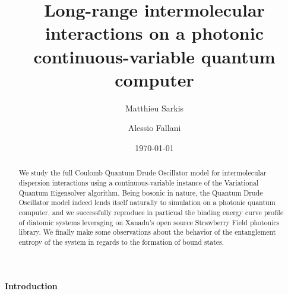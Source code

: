 \documentclass[reprint, amsmath, amssymb, aps, pra]{revtex4-2}
\begin{document}
\preprint{}

\title{Long-range intermolecular interactions on a photonic continuous-variable quantum computer}

\author{Matthieu Sarkis}

\author{Alessio Fallani}


\date{\today}

\begin{abstract}
    We study the full Coulomb Quantum Drude Oscillator model for intermolecular dispersion interactions using a continuous-variable instance of the Variational Quantum Eigensolver algorithm. Being bosonic in nature, the Quantum Drude Oscillator model indeed lends itself naturally to simulation on a photonic quantum computer, and we successfully reproduce in particual the binding energy curve profile of diatomic systems leveraging on Xanadu's open source Strawberry Field photonics library. We finally make some observations about the behavior of the entanglement entropy of the system in regards to the formation of bound states.
\end{abstract}


\maketitle


\paragraph*{Introduction}
\end{document}
